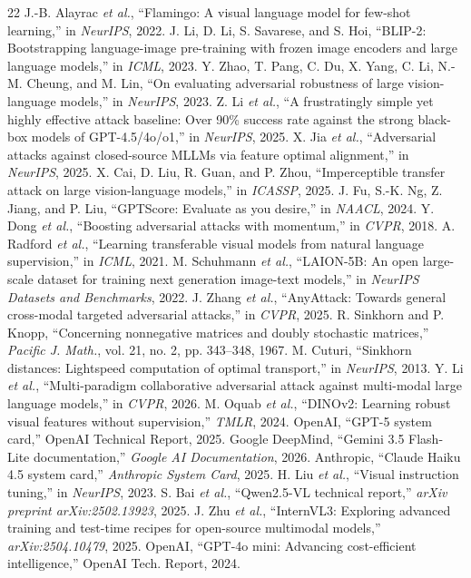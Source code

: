 \documentclass{article}
\begin{document}
\clearpage
\balance\begin{thebibliography}{22}
 J.-B. Alayrac \emph{et al.}, ``Flamingo: A visual language model for few-shot learning,'' in \emph{NeurIPS}, 2022.
 J. Li, D. Li, S. Savarese, and S. Hoi, ``BLIP-2: Bootstrapping language-image pre-training with frozen image encoders and large language models,'' in \emph{ICML}, 2023.
 Y. Zhao, T. Pang, C. Du, X. Yang, C. Li, N.-M. Cheung, and M. Lin, ``On evaluating adversarial robustness of large vision-language models,'' in \emph{NeurIPS}, 2023.
 Z. Li \emph{et al.}, ``A frustratingly simple yet highly effective attack baseline: Over 90\% success rate against the strong black-box models of GPT-4.5/4o/o1,'' in \emph{NeurIPS}, 2025.
 X. Jia \emph{et al.}, ``Adversarial attacks against closed-source MLLMs via feature optimal alignment,'' in \emph{NeurIPS}, 2025.
 X. Cai, D. Liu, R. Guan, and P. Zhou, ``Imperceptible transfer attack on large vision-language models,'' in \emph{ICASSP}, 2025.
 J. Fu, S.-K. Ng, Z. Jiang, and P. Liu, ``GPTScore: Evaluate as you desire,'' in \emph{NAACL}, 2024.
 Y. Dong \emph{et al.}, ``Boosting adversarial attacks with momentum,'' in \emph{CVPR}, 2018.
 A. Radford \emph{et al.}, ``Learning transferable visual models from natural language supervision,'' in \emph{ICML}, 2021.
 M. Schuhmann \emph{et al.}, ``LAION-5B: An open large-scale dataset for training next generation image-text models,'' in \emph{NeurIPS Datasets and Benchmarks}, 2022.
 J. Zhang \emph{et al.}, ``AnyAttack: Towards general cross-modal targeted adversarial attacks,'' in \emph{CVPR}, 2025.
 R. Sinkhorn and P. Knopp, ``Concerning nonnegative matrices and doubly stochastic matrices,'' \emph{Pacific J. Math.}, vol. 21, no. 2, pp. 343--348, 1967.
 M. Cuturi, ``Sinkhorn distances: Lightspeed computation of optimal transport,'' in \emph{NeurIPS}, 2013.
 Y. Li \emph{et al.}, ``Multi-paradigm collaborative adversarial attack against multi-modal large language models,'' in \emph{CVPR}, 2026.
 M. Oquab \emph{et al.}, ``DINOv2: Learning robust visual features without supervision,'' \emph{TMLR}, 2024.
 OpenAI, ``GPT-5 system card,'' OpenAI Technical Report, 2025.
 Google DeepMind, ``Gemini 3.5 Flash-Lite documentation,'' \emph{Google AI Documentation}, 2026.
 Anthropic, ``Claude Haiku 4.5 system card,'' \emph{Anthropic System Card}, 2025.
 H. Liu \emph{et al.}, ``Visual instruction tuning,'' in \emph{NeurIPS}, 2023.
 S. Bai \emph{et al.}, ``Qwen2.5-VL technical report,'' \emph{arXiv preprint arXiv:2502.13923}, 2025.
 J. Zhu \emph{et al.}, ``InternVL3: Exploring advanced training and test-time recipes for open-source multimodal models,'' \emph{arXiv:2504.10479}, 2025.
 OpenAI, ``GPT-4o mini: Advancing cost-efficient intelligence,'' OpenAI Tech. Report, 2024.
\end{thebibliography}
\end{document}
